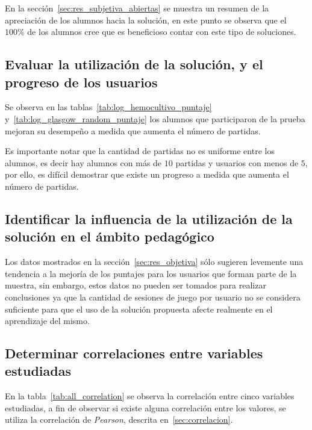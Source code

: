 En la sección~\ref{sec:res_subjetiva_abiertas} se muestra un resumen de la
apreciación de los alumnos hacia la solución, en este punto se observa que el
$100\%$ de los alumnos cree que es beneficioso contar con este tipo de
soluciones.


\subsection{Evaluar la utilización de la solución, y el progreso de los
    usuarios}

Se observa en las tablas~\ref{tab:log_hemocultivo_puntaje}
y~\ref{tab:log_glasgow_random_puntaje} los alumnos que participaron de la prueba
mejoran su desempeño a medida que aumenta el número de partidas. 

Es importante notar que la cantidad de partidas no es uniforme entre los
alumnos, es decir hay alumnos con más de $10$ partidas y usuarios con menos de
$5$, por ello, es difícil demostrar que existe un progreso a medida que aumenta
el número de partidas.

\subsection{Identificar la influencia de la utilización de la solución en el ámbito
    pedagógico}

Los datos mostrados en la sección~\ref{sec:res_objetiva} sólo sugieren levemente
una tendencia a la mejoría de los puntajes para los usuarios que forman parte de
la muestra, sin embargo, estos datos no pueden ser tomados para realizar
conclusiones ya que la cantidad de sesiones de juego por usuario no se considera
suficiente para que el uso de la solución propuesta afecte realmente en el
aprendizaje del mismo.

\subsection{Determinar correlaciones entre variables estudiadas}

En la tabla~\ref{tab:all_correlation} se observa la correlación entre cinco
variables estudiadas, a fin de observar si existe alguna correlación entre los
valores, se utiliza la correlación de \emph{Pearson}, descrita
en~\ref{sec:correlacion}.

